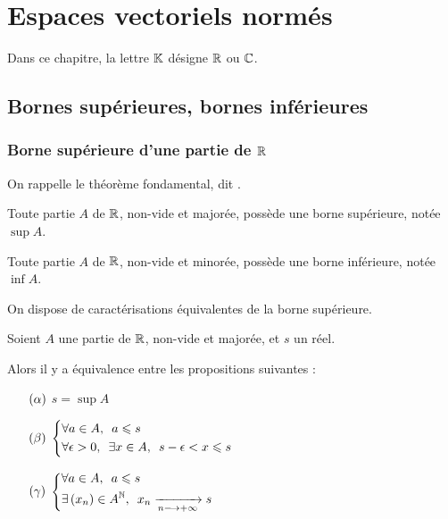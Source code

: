 \chapter{Espaces vectoriels normés}

\minitoc

Dans ce chapitre, la lettre \(\mathbb{K}\) désigne \(\mathbb{R}\) ou \(\mathbb{C}\).

\section{Bornes supérieures, bornes inférieures}

\subsection{Borne supérieure d'une partie de \(\mathbb{R}\)}

On rappelle le théorème fondamental, dit .

\begin{theo}
Toute partie \(A\) de \(\mathbb{R}\), non-vide et majorée, possède une borne supérieure, notée \(\sup A\).

Toute partie \(A\) de \(\mathbb{R}\), non-vide et minorée, possède une borne inférieure, notée \(\inf A\).
\end{theo}

On dispose de caractérisations équivalentes de la borne supérieure.

\begin{prop}
Soient \(A\) une partie de \(\mathbb{R}\), non-vide et majorée, et \(s\) un réel.

Alors il y a équivalence entre les propositions suivantes :

\begin{enumerate}
    \item[\(\left(\alpha\right)\)] \(s=\sup A\) \\
    \item[\(\left(\beta\right)\)] \(\begin{dcases}\quantifs{\forall a\in A}a\leq s \\ \quantifs{\forall\epsilon>0;\exists x\in A}s-\epsilon<x\leq s\end{dcases}\) \\
    \item[\(\left(\gamma\right)\)] \(\begin{dcases}\quantifs{\forall a\in A}a\leq s \\ \quantifs{\exists\paren{x_n}\in A^\N}x_n\tendqd{n\to\pinf}s\end{dcases}\)
\end{enumerate}
\end{prop}

